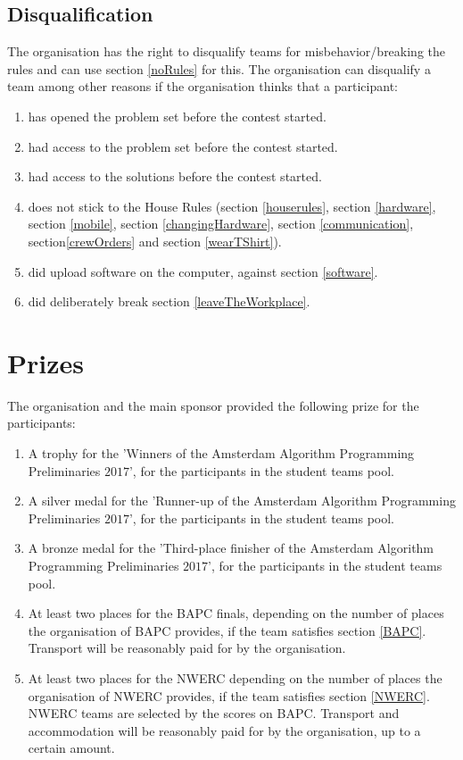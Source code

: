 \documentclass[11pt]{report}
\begin{document}
\section{Disqualification}
The organisation has the right to disqualify teams for misbehavior/breaking the rules and can use section \ref{noRules} for this. The organisation can disqualify a team among other reasons if the organisation thinks that a participant:
\begin{enumerate}[label=\bfseries 4.7.\arabic*]
\item \label{Problemset} has opened the problem set before the contest started.
\item \label{proofProblemset} had access to the problem set before the contest started.
\item \label{proofSolutions} had access to the solutions before the contest started.
\item does not stick to the House Rules (section \ref{houserules}, section \ref{hardware}, section \ref{mobile}, section \ref{changingHardware}, section \ref{communication}, section\ref{crewOrders} and section \ref{wearTShirt}).
\item did upload software on the computer, against section \ref{software}.
\item did deliberately break section \ref{leaveTheWorkplace}.
\end{enumerate}

\chapter{Prizes}
The organisation and the main sponsor provided the following prize for the participants: %
\begin{enumerate}[label=\bfseries 5.\arabic*]
\item A trophy for the 'Winners of the Amsterdam Algorithm Programming Preliminaries $2017$', for the participants in the student teams pool.
\item A silver medal for the 'Runner-up of the Amsterdam Algorithm Programming Preliminaries $2017$', for the participants in the student teams pool.
\item A bronze medal for the 'Third-place finisher of the Amsterdam Algorithm Programming Preliminaries $2017$', for the participants in the student teams pool.
\item At least two places for the BAPC finals, depending on the number of places the organisation of BAPC provides, if the team satisfies section \ref{BAPC}. Transport will be reasonably paid for by the organisation.
\item At least two places for the NWERC depending on the number of places the organisation of NWERC provides, if the team satisfies section \ref{NWERC}. NWERC teams are selected by the scores on BAPC. Transport and accommodation will be reasonably paid for by the organisation, up to a certain amount. 
\end{enumerate}
\end{document}
